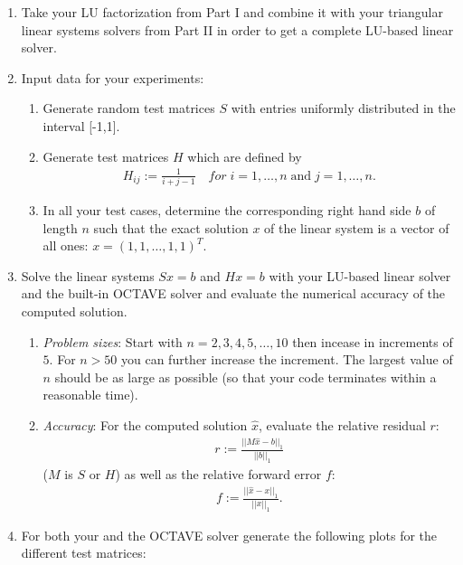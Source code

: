 \documentclass{scrartcl}
\begin{document}
    \begin{enumerate}
        \item Take your LU factorization from Part I and combine it with your triangular linear systems solvers from Part II in order to get a complete LU-based linear solver.
        \item Input data for your experiments:
        \begin{enumerate}
            \item Generate random test matrices $S$ with entries uniformly distributed in the interval [-1,1].
            \item Generate test matrices $H$ which are defined by
            \begin{align*}
                H_{ij} := \frac{1}{i+j-1} \quad for \;i=1,\dots,n \; \mbox{and} \; j=1, \dots, n.
            \end{align*}
            \item In all your test cases, determine the corresponding right hand side $b$ of length $n$ such that the exact solution $x$ of the linear system is a vector of all ones: $x = (1, 1, \dots, 1, 1)^{T}$.
        \end{enumerate}
        \item Solve the linear systems $Sx = b$ and $Hx=b$ with your LU-based linear solver and the built-in OCTAVE solver and evaluate the numerical accuracy of the computed solution.
        \begin{enumerate}
            \item \textit{Problem sizes}: Start with $n=2,3,4,5,\dots,10$ then incease in increments of $5$. For $n > 50$ you can further increase the increment. The largest value of $n$ should be as large as possible (so that your code terminates within a reasonable time).
            \item \textit{Accuracy}: For the computed solution $\hat{x}$, evaluate the relative residual $r$:
            \begin{align*}
                r := \frac{||M\hat{x} - b||_1}{||b||_1}
            \end{align*}
            ($M$ is $S$ or $H$)
            as well as the relative forward error $f$:
            \begin{align*}
                f := \frac{||\hat{x} - x||_1}{||x||_1}. 
            \end{align*}
        \end{enumerate}
        \item For both your and the OCTAVE solver generate the following plots for the different test matrices:

\end{enumerate}
\end{document}
